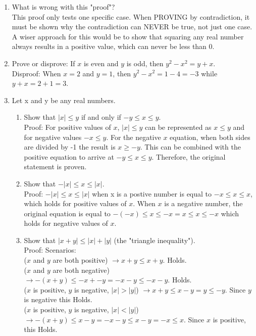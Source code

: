 \documentclass{article}
\begin{document}
\begin{enumerate}
\item What is wrong with this "proof"? \\
    This proof only tests one specific case. When PROVING by contradiction, it must be shown why the contradiction can NEVER be true, not just one case. A wiser approach for this would be to show that squaring any real number always results in a positive value, which can never be less than 0. 
\item Prove or disprove: If $x$ is even and $y$ is odd, then $y^2-x^2=y+x$. \\
    Disproof: When $x=2$ and $y=1$, then $y^2-x^2=1-4=-3$ while $y+x=2+1=3$. \Lightning
\item Let x and y be any real numbers.
    \begin{enumerate}
        \item Show that $|x| \leq y$ if and only if $-y \leq x \leq y$. \\
            Proof: For positive values of $x$, $|x| \leq y$ can be represented as $x \leq y$ and for negative values $-x \leq y$. For the negative $x$ equation, when both sides are divided by -1 the result is $x \geq -y$. This can be combined with the positive equation to arrive at $-y \leq x \leq y$. Therefore, the original statement is proven. 
        \item Show that $-|x| \leq x \leq |x|$.\\
            Proof: $-|x| \leq x \leq |x|$ when x is a postive number is equal to $-x \leq x \leq x$, which holds for positive values of $x$. When $x$ is a negative number, the original equation is equal to $-(-x) \leq x \leq -x = x \leq x \leq -x$ which holds for negative values of $x$. 
        \item Show that $|x+y| \leq |x| + |y|$ (the "triangle inequality"). \\
            Proof: Scenarios: \\
            ($x$ and $y$ are both positive) $\rightarrow x + y \leq x + y$. Holds. \\
            ($x$ and $y$ are both negative) $\rightarrow -(x+y) \leq -x + -y = -x-y \leq -x-y$. Holds. \\
            ($x$ is positive, $y$ is negative, $|x| > |y|$) $\rightarrow x+y \leq x-y =  y \leq -y$. Since $y$ is negative this Holds. \\
            ($x$ is positive, $y$ is negative, $|x| < |y|$) $\rightarrow -(x+y) \leq x-y = -x-y \leq x-y = -x \leq x$. Since $x$ is positive, this Holds. \\

\end{enumerate}
\end{enumerate}
\end{document}
